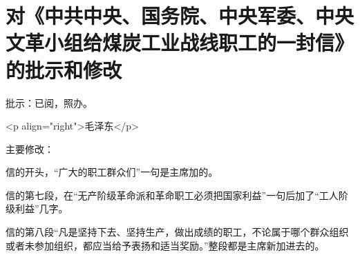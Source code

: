 \section[对《中共中央、国务院、中央军委、中央文革小组给煤炭工业战线职工的一封信》的批示和修改（一九六七年八月十六日）]{对《中共中央、国务院、中央军委、中央文革小组给煤炭工业战线职工的一封信》的批示和修改}


批示：已阅，照办。

<p align="right">毛泽东</p>

主要修改：

信的开头，“广大的职工群众们”一句是主席加的。

信的第七段，在“无产阶级革命派和革命职工必须把国家利益”一句后加了“工人阶级利益”几字。

信的第八段“凡是坚持下去、坚持生产，做出成绩的职工，不论属于哪个群众组织或者未参加组织，都应当给予表扬和适当奖励。”整段都是主席新加进去的。



